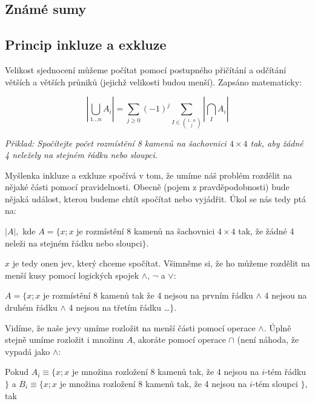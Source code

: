 \goodbreak
\subsection{Známé sumy}
\medskip
{}

\subsection{Princip inkluze a exkluze}
Velikost sjednocení mů\-že\-me po\-čí\-tat pomocí postupného při\-čí\-tá\-ní a odčítání větších
a větších průniků (jejichž velikosti budou menší). Zapsáno matematicky:

$$|\bigcup_{1\dots n} A_i| = \sum_{j\ge 0} (-1)^j \sum_{I \in {1\dots n \choose j}} |\bigcap_I A_i|$$


{\it Přiklad: Spočítejte počet rozmístění 8 kamenů na šachovnici $4 × 4$ tak, aby žádné 4 neležely na stejném řádku nebo sloupci.}

Myšlenka inkluze a exkluze spočívá v tom, že umíme náš problém
rozdělit na nějaké části pomocí pravidelnosti. Obecně 
(pojem z pravděpodobnosti) bude nějaká událost, kterou budeme chtít
spočítat nebo vyjádřit. Úkol se nás tedy ptá na:

$|A|,$ kde $A = \{x ; x$ je rozmístění 8 kamenů na šachovnici $4 × 4$
tak, že žádné 4 neleži na stejném řádku nebo sloupci$\}$.

$x$ je tedy onen jev, který chceme spočítat. Všimněme si, že ho můžeme
rozdělit na menší kusy pomocí logických spojek $∧$, $¬$ a $∨$:

$A = \{x ; x$ je rozmístění 8 kamenů tak že 4 nejsou na prvním řádku
$∧$ 4 nejsou na druhém řádku $∧$ 4 nejsou na třetím řádku \dots $\}$.

Vidíme, že naše jevy umíme rozložit na menší části pomocí operace
$∧$. Úplně stejně umíme rozložit i množinu $A$, akoráte pomocí operace
$∩$ (není náhoda, že vypadá jako $∧$:

Pokud $A_i ≡ \{x ; x $ je množina rozložení 8 kamenů tak, že 4 nejsou
na $i$-tém řádku $\}$ a $B_i ≡ \{x; x $ je množina rozložení 8 kamenů
tak, že 4 nejsou na $i$-tém sloupci $\}$, tak

